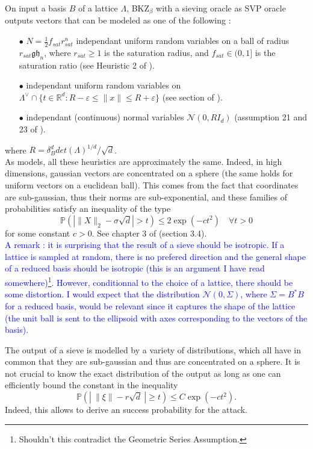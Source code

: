 \documentclass{article}
\begin{document}
On input a basis $B$ of a lattice $\Lambda$, BKZ$_\beta$ with a sieving oracle as SVP oracle outputs vectors that can be modeled as one of the following :
\begin{itemize}
\item[$\bullet$] $N = \frac{1}{2}f_{sat}r_{sat}^n$ independant uniform random variables on a ball of radius $r_{sat} \mathfrak{gh}_n$, where $r_{sat}\geq 1$ is the saturation radius, and $f_{sat}\in (0,1]$ is the saturation ratio (see Heuristic 2 of \cite{ducas2023accurate}).
\item[$\bullet$] independant uniform random variables on $\Lambda^\vee \cap \{t\in \mathbb R^d : R-\varepsilon\leq \|x\| \leq R+\varepsilon\}$ (see section of \cite{carrier2024reduction}). 
\item[$\bullet$] independant (continuous) normal variables $\mathcal N(0,R I_d)$ (assumption 21 and 23 of \cite{espitau2020dual}). 
\end{itemize}
where $R = \delta_B^d det(\Lambda)^{1/d} / \sqrt{d}$. \\

As models, all these heuristics are approximately the same. Indeed, in high dimensions, gaussian vectors are concentrated on a sphere (the same holds for uniform vectors on a euclidean ball). This comes from the fact that coordinates are sub-gaussian, thus their norms are sub-exponential, and these families of probabilities satisfy an inequality of the type 
\[\mathbb P(| \|X\|_2 - \sigma \sqrt{d} |> t  ) \leq 2\exp(-ct^2)\quad \forall t>0\]
for some constant $c>0$. See chapter 3 of \cite{vershynin2018high} (section 3.4). \\
   
\textcolor{blue}{A remark : it is surprising that the result of a sieve should be isotropic. If a lattice is sampled at random, there is no prefered direction and the general shape of a reduced basis should be isotropic (this is an argument I have read somewhere)\footnote{Shouldn't this contradict the Geometric Series Assumption.}. However, conditionnal to the choice of a lattice, there should be some distortion. I would expect that the distribution $\mathcal N(0,\Sigma)$, where $\Sigma = B^*B$ for a reduced basis, would be relevant since it captures the shape of the lattice (the unit ball is sent to the ellipsoid with axes corresponding to the vectors of the basis). }

The output of a sieve is modelled by a variety of distributions, which all have in common that they are sub-gaussian and thus are concentrated on a sphere. It is not crucial to know the exact distribution of the output as long as one can efficiently bound the constant in the inequality
\[\mathbb P(| \ \|\xi\| - r\sqrt{d} \ | \geq t) \leq C\exp(-ct^2).\]
Indeed, this allows to derive an success probability for the attack. 
\end{document}
